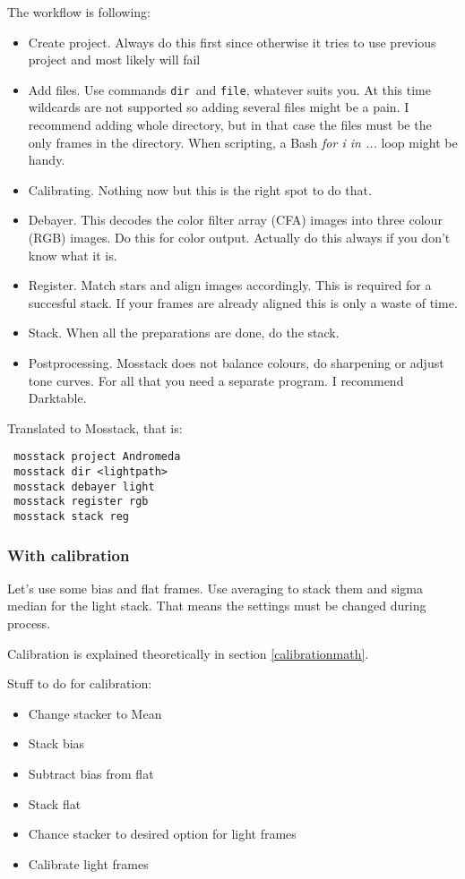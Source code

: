 \documentclass[twoside,a4paper]{refart}
\begin{document}
The workflow is following:
\begin{itemize}
 \item Create project. Always do this first since otherwise it tries to use previous project and most likely will
       fail
 \item Add files. Use commands \texttt{dir} and \texttt{file}, whatever suits you. At this time wildcards are not
       supported so adding several files might be a pain. I recommend adding whole directory, but in that case
       the files must be the only frames in the directory. When scripting, a Bash \textit{for i in ...} loop
       might be handy.
 \item Calibrating. Nothing now but this is the right spot to do that.
 \item Debayer. This decodes the color filter array (CFA) images into three colour (RGB) images. Do this for 
       color output. Actually do this always if you don't know what it is.
 \item Register. Match stars and align images accordingly. This is required for a succesful stack. If your frames
       are already aligned this is only a waste of time.
 \item Stack. When all the preparations are done, do the stack.
 \item Postprocessing. Mosstack does not balance colours, do sharpening or adjust tone curves. For all that
       you need a separate program. I recommend Darktable.
\end{itemize}

Translated to Mosstack, that is:

\begin{verbatim}
 mosstack project Andromeda
 mosstack dir <lightpath>
 mosstack debayer light
 mosstack register rgb
 mosstack stack reg
\end{verbatim}

\subsubsection{With calibration}

Let's use some bias and flat frames. Use averaging to stack them and sigma median for the light stack. That means
the settings must be changed during process.

Calibration is explained theoretically in section \ref{calibrationmath}.

Stuff to do for calibration:
\begin{itemize}
 \item Change stacker to Mean 
 \item Stack bias
 \item Subtract bias from flat
 \item Stack flat
 \item Chance stacker to desired option for light frames
 \item Calibrate light frames
\end{itemize}
\end{document}
